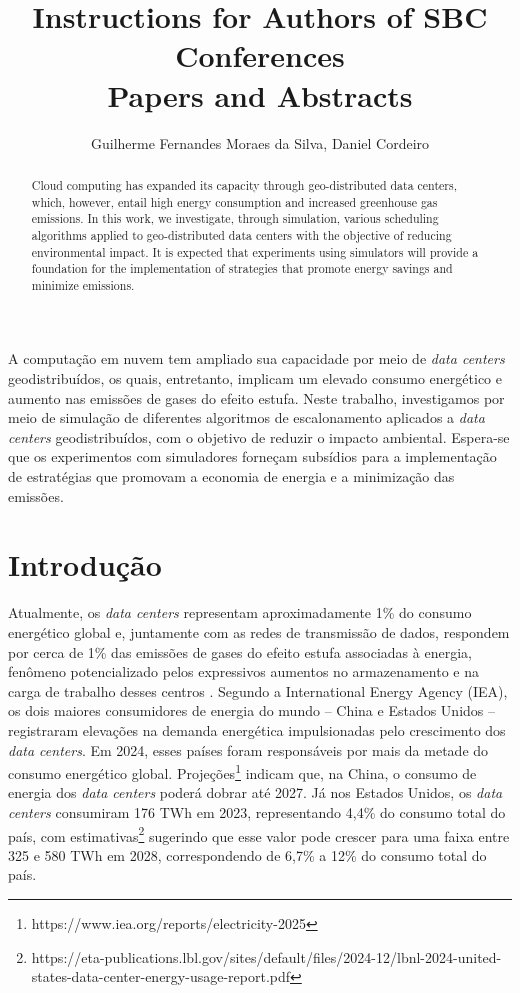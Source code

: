 \documentclass[12pt]{article}
\title{Instructions for Authors of SBC Conferences\\ Papers and Abstracts}
\author{Guilherme Fernandes Moraes da Silva\inst{1}, Daniel Cordeiro\inst{1}}
\begin{document}
 

\maketitle

\begin{abstract}
Cloud computing has expanded its capacity through geo-distributed data centers, which, however, entail high energy consumption and increased greenhouse gas emissions. In this work, we investigate, through simulation, various scheduling algorithms applied to geo-distributed data centers with the objective of reducing environmental impact. It is expected that experiments using simulators will provide a foundation for the implementation of strategies that promote energy savings and minimize emissions.
\end{abstract}
     
\begin{resumo}
A computação em nuvem tem ampliado sua capacidade por meio de \textit{data centers} geodistribuídos, os quais, entretanto, implicam um elevado consumo energético e aumento nas emissões de gases do efeito estufa. Neste trabalho, investigamos por meio de simulação de diferentes algoritmos de escalonamento aplicados a \textit{data centers} geodistribuídos, com o objetivo de reduzir o impacto ambiental. Espera-se que os experimentos com simuladores forneçam subsídios para a implementação de estratégias que promovam a economia de energia e a minimização das emissões.
\end{resumo}


\section{Introdução}
Atualmente, os \textit{data centers} representam aproximadamente 1\% do consumo energético global e, juntamente com as redes de transmissão de dados, respondem por cerca de 1\% das emissões de gases do efeito estufa associadas à energia, fenômeno potencializado pelos expressivos aumentos no armazenamento e na carga de trabalho desses centros \cite{masanet:20}. Segundo a International Energy Agency (IEA), os dois maiores consumidores de energia do mundo -- China e Estados Unidos -- registraram elevações na demanda energética impulsionadas pelo crescimento dos \textit{data centers}. Em 2024, esses países foram responsáveis por mais da metade do consumo energético global. Projeções\footnote{https://www.iea.org/reports/electricity-2025} indicam que, na China, o consumo de energia dos \textit{data centers} poderá dobrar até 2027. Já nos Estados Unidos, os \textit{data centers} consumiram 176 TWh em 2023, representando 4,4\% do consumo total do país, com estimativas\footnote{https://eta-publications.lbl.gov/sites/default/files/2024-12/lbnl-2024-united-states-data-center-energy-usage-report.pdf} sugerindo que esse valor pode crescer para uma faixa entre 325 e 580 TWh em 2028, correspondendo de 6,7\% a 12\% do consumo total do país.
\end{document}
